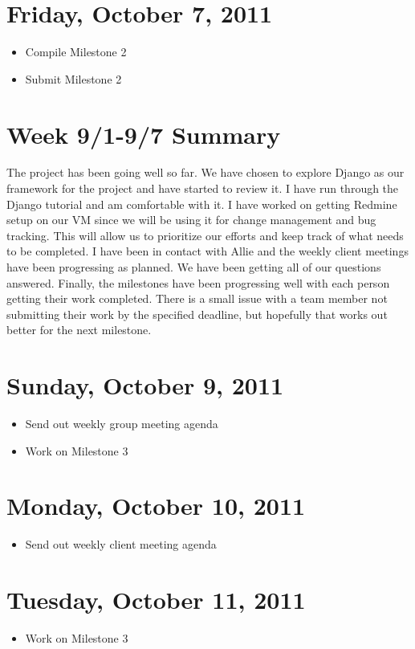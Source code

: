 \documentclass{article}
\begin{document}
\section{Friday, October 7, 2011}
\begin{itemize}
\item Compile Milestone 2
\item Submit Milestone 2
\end{itemize}

\section*{Week 9/1-9/7 Summary}
The project has been going well so far. We have chosen to explore Django as our framework for the project and have started to review it. I have run through the Django tutorial and am comfortable with it. I have worked on getting Redmine setup on our VM since we will be using it for change management and bug tracking. This will allow us to prioritize our efforts and keep track of what needs to be completed. I have been in contact with Allie and the weekly client meetings have been progressing as planned. We have been getting all of our questions answered. Finally, the milestones have been progressing well with each person getting their work completed. There is a small issue with a team member not submitting their work by the specified deadline, but hopefully that works out better for the next milestone.

\section{Sunday, October 9, 2011}
\begin{itemize}
\item Send out weekly group meeting agenda
\item Work on Milestone 3
\end{itemize}

\section{Monday, October 10, 2011}
\begin{itemize}
\item Send out weekly client meeting agenda
\end{itemize}

\section{Tuesday, October 11, 2011}
\begin{itemize}
\item Work on Milestone 3
\end{itemize}
\end{document}
